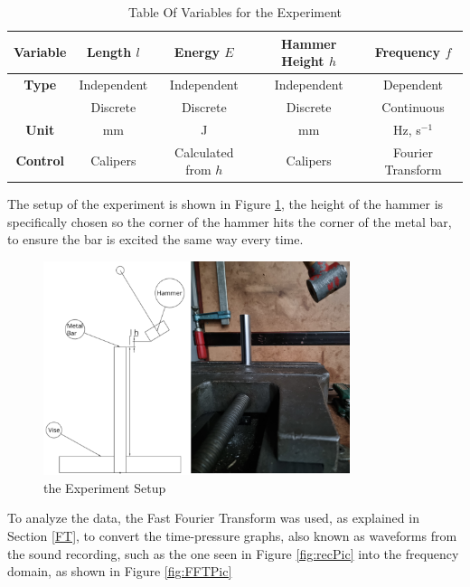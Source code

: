 \documentclass[a4paper,12pt]{article}
\begin{document}
    \begin{table}[H]%
    \begin{center}
    \begin{tabular}[H]{|c|c|c|c||c|}
    \hline
    \textbf{Variable} & Length $l$  & Energy $E$  & Hammer Height $h$ & Frequency $f$ \\
    \hline\hline
    \textbf{Type}     & Independent & Independent & Independent     & Dependent  \\
             & Discrete    & Discrete    & Discrete        & Continuous  \\
    \hline
    \textbf{Unit}     & mm          & J           & mm              & Hz, s$^{-1}$ \\
    \hline
    \textbf{Control} & Calipers    & Calculated from $h$ & Calipers&  Fourier Transform\\
    \hline
    \end{tabular}
    \end{center}
    \caption{Table Of Variables for the Experiment}\label{Tab:ExpVarTable}
    \end{table}
    The setup of the experiment is shown in Figure \ref{fig:EXPPic}, the height of the hammer is specifically chosen so the corner of the hammer hits the corner of the metal bar, to ensure the bar is excited the same way every time.

    \begin{figure}[H]%
    \includegraphics[width=0.8\textwidth]{setup+diag}
    \centering
    \caption{the Experiment Setup}\label{fig:EXPPic}
    \end{figure}
    To analyze the data, the Fast Fourier Transform was used, as explained in Section \ref{FT}, to convert the time-pressure graphs, also known as waveforms from the sound recording, such as the one seen in Figure \ref{fig:recPic} into the frequency domain, as shown in Figure \ref{fig:FFTPic}
\end{document}
